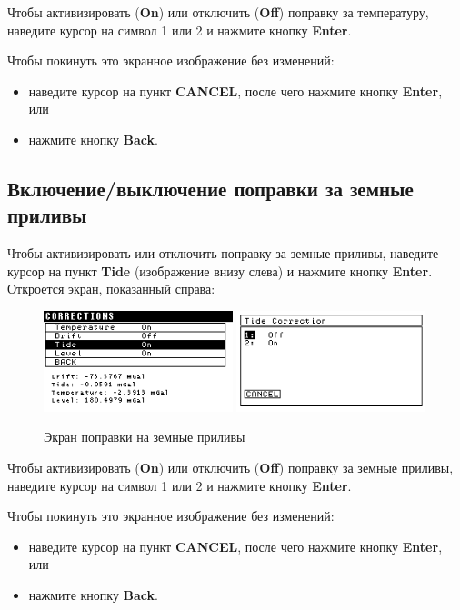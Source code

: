 Чтобы активизировать (\textbf{On}) или отключить (\textbf{Off}) поправку за
температуру, наведите курсор на символ 1 или 2 и нажмите кнопку \textbf{Enter}.

Чтобы покинуть это экранное изображение без изменений:
\begin{itemize}
  \item наведите курсор на пункт \textbf{CANCEL}, после чего нажмите кнопку
    \textbf{Enter}, или

  \item нажмите кнопку \textbf{Back}.
\end{itemize}

\subsection{Включение/выключение поправки за земные приливы}

Чтобы активизировать или отключить поправку за земные приливы, наведите курсор
на пункт \textbf{Tide} (изображение внизу слева) и нажмите кнопку
\textbf{Enter}. Откроется экран, показанный справа:

\begin{figure}[H]
  \centering
  \includegraphics[width=0.49\textwidth]{figures/the_tide_correction_screen_1}
  \includegraphics[width=0.49\textwidth]{figures/the_tide_correction_screen_2}
  \caption{Экран поправки на земные приливы}
  \label{fig:the_tide_correction_screen}
\end{figure}

Чтобы активизировать (\textbf{On}) или отключить (\textbf{Off}) поправку за
земные приливы, наведите курсор на символ 1 или 2 и нажмите кнопку
\textbf{Enter}.

Чтобы покинуть это экранное изображение без изменений:
\begin{itemize}
  \item наведите курсор на пункт \textbf{CANCEL}, после чего нажмите кнопку
    \textbf{Enter}, или

  \item нажмите кнопку \textbf{Back}.
\end{itemize}

